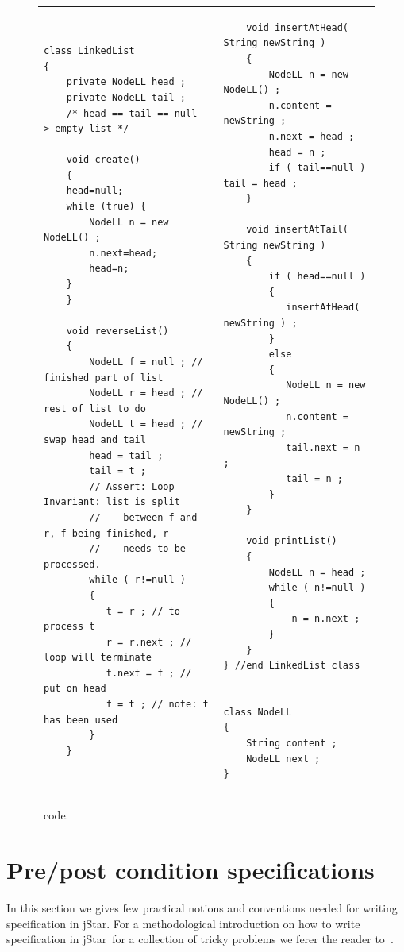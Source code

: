 \documentclass[11pt]{article}
\newcommand{\jStar}{{\sf jStar}}
\begin{document}
\begin{figure}[t]
  \centering
  \begin{tabular}{l|l}
    \begin{lstlisting}
class LinkedList
{
    private NodeLL head ;
    private NodeLL tail ;
    /* head == tail == null -> empty list */

    void create()
    {
	head=null;
	while (true) {
	    NodeLL n = new NodeLL() ;
	    n.next=head;
	    head=n;
	}
    }
    
    void reverseList()
    {
        NodeLL f = null ; // finished part of list
        NodeLL r = head ; // rest of list to do
        NodeLL t = head ; // swap head and tail
        head = tail ;
        tail = t ;
        // Assert: Loop Invariant: list is split
        //    between f and r, f being finished, r
        //    needs to be processed.
        while ( r!=null )
        {
           t = r ; // to process t
           r = r.next ; // loop will terminate 
           t.next = f ; // put on head
           f = t ; // note: t has been used
        }
    }
\end{lstlisting}
& \qquad \quad
\begin{lstlisting}            
    void insertAtHead( String newString )
    {
        NodeLL n = new NodeLL() ;
        n.content = newString ;
        n.next = head ;
        head = n ;
        if ( tail==null ) tail = head ;
    }

    void insertAtTail( String newString )
    {
        if ( head==null )
        {
           insertAtHead( newString ) ;
        }
        else
        {
           NodeLL n = new NodeLL() ;
           n.content = newString ;
           tail.next = n ;
           tail = n ;
        }
    }
    
    void printList()
    {
        NodeLL n = head ;
        while ( n!=null )
        {
            n = n.next ;
        }
    }    
} //end LinkedList class


class NodeLL
{
    String content ;
    NodeLL next ;
}
\end{lstlisting}
  \end{tabular}
  \caption{\linkedlist \ code.}
  \label{tab:linkedlist}
\end{figure}


\section{Pre/post condition specifications}
\label{sec:pre/post}
In this section we gives few practical notions and conventions needed
for writing specification in \jStar. For a methodological introduction
on how to write specification in \jStar \ for a collection of tricky
problems we ferer the reader to~\cite{jstar}.
\end{document}
